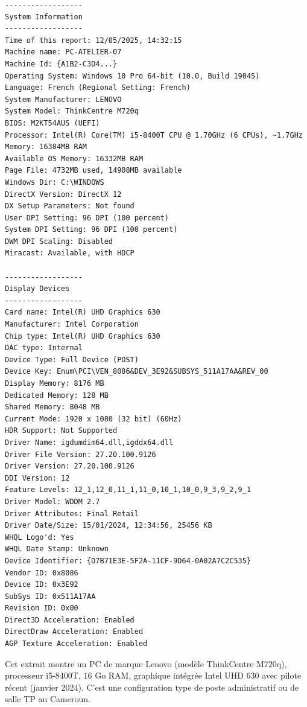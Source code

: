 \documentclass[11pt]{article}
\begin{document}
\begin{exemplebox}
\begin{lstlisting}
------------------
System Information
------------------
Time of this report: 12/05/2025, 14:32:15
Machine name: PC-ATELIER-07
Machine Id: {A1B2-C3D4...}
Operating System: Windows 10 Pro 64-bit (10.0, Build 19045)
Language: French (Regional Setting: French)
System Manufacturer: LENOVO
System Model: ThinkCentre M720q
BIOS: M2KT54AUS (UEFI)
Processor: Intel(R) Core(TM) i5-8400T CPU @ 1.70GHz (6 CPUs), ~1.7GHz
Memory: 16384MB RAM
Available OS Memory: 16332MB RAM
Page File: 4732MB used, 14908MB available
Windows Dir: C:\WINDOWS
DirectX Version: DirectX 12
DX Setup Parameters: Not found
User DPI Setting: 96 DPI (100 percent)
System DPI Setting: 96 DPI (100 percent)
DWM DPI Scaling: Disabled
Miracast: Available, with HDCP

------------------
Display Devices
------------------
Card name: Intel(R) UHD Graphics 630
Manufacturer: Intel Corporation
Chip type: Intel(R) UHD Graphics 630
DAC type: Internal
Device Type: Full Device (POST)
Device Key: Enum\PCI\VEN_8086&DEV_3E92&SUBSYS_511A17AA&REV_00
Display Memory: 8176 MB
Dedicated Memory: 128 MB
Shared Memory: 8048 MB
Current Mode: 1920 x 1080 (32 bit) (60Hz)
HDR Support: Not Supported
Driver Name: igdumdim64.dll,igddx64.dll
Driver File Version: 27.20.100.9126
Driver Version: 27.20.100.9126
DDI Version: 12
Feature Levels: 12_1,12_0,11_1,11_0,10_1,10_0,9_3,9_2,9_1
Driver Model: WDDM 2.7
Driver Attributes: Final Retail
Driver Date/Size: 15/01/2024, 12:34:56, 25456 KB
WHQL Logo'd: Yes
WHQL Date Stamp: Unknown
Device Identifier: {D7B71E3E-5F2A-11CF-9D64-0A02A7C2C535}
Vendor ID: 0x8086
Device ID: 0x3E92
SubSys ID: 0x511A17AA
Revision ID: 0x00
Direct3D Acceleration: Enabled
DirectDraw Acceleration: Enabled
AGP Texture Acceleration: Enabled
\end{lstlisting}
Cet extrait montre un PC de marque Lenovo (modèle ThinkCentre M720q), processeur i5-8400T, 16 Go RAM, graphique intégrée Intel UHD 630 avec pilote récent (janvier 2024). C'est une configuration type de poste administratif ou de salle TP au Cameroun.
\end{exemplebox}
\end{document}
